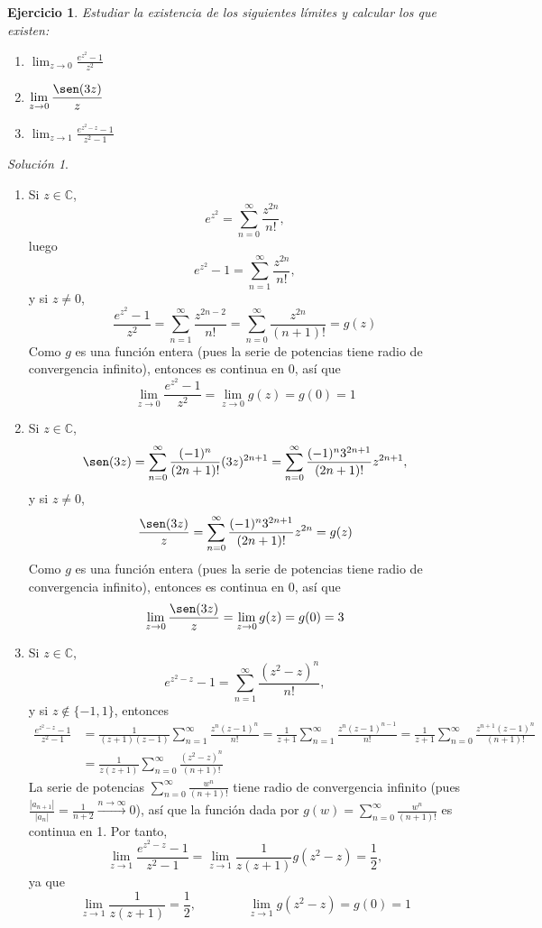 \documentclass[11pt]{report}
\newcommand{\C}{\mathbb C}
\newcommand{\serie}[2][0]{\sum_{n=#1}^\infty #2}
\newtheorem{exercise}{Ejercicio}
\theoremstyle{remark}
\newtheorem*{resolution}{Solución}
\begin{document}
\begin{exercise}
Estudiar la existencia de los siguientes límites y calcular los que existen:
\begin{enumerate}
    \item $\displaystyle \lim_{z \to 0}\frac{e^{z^2}-1}{z^2}$
    \item $\displaystyle \lim_{z \to 0} \frac{\sen(3z)}{z}$
    \item $\displaystyle \lim_{z \to 1} \frac{e^{z^2-z}-1}{z^2-1}$
\end{enumerate}
\end{exercise}

\begin{resolution}
\hfill
\begin{enumerate}
    \item Si $z \in \C$,
    \[e^{z^2} = \serie{\frac{z^{2n}}{n!}},\]
    luego
    \[e^{z^2}-1=\serie[1]{\frac{z^{2n}}{n!}},\]
    y si $z \neq 0$,
    \[\frac{e^{z^2}-1}{z^2} =\serie[1]{\frac{z^{2n-2}}{n!}} = \serie{\frac{z^{2n}}{(n+1)!}} = g(z)\]
    Como $g$ es una función entera (pues la serie de potencias tiene radio de convergencia infinito), entonces es continua en $0$, así que
    \[\lim_{z \to 0}\frac{e^{z^2}-1}{z^2} = \lim_{z \to 0} g(z) = g(0)=1\]
    \item Si $z \in \C$,
    \[\sen(3z)=\serie{\frac{(-1)^n}{(2n+1)!}(3z)^{2n+1}} = \serie{\frac{(-1)^n3^{2n+1}}{(2n+1)!}z^{2n+1}},\]
    y si $z \neq 0$,
    \[\frac{\sen(3z)}{z} = \serie{\frac{(-1)^n3^{2n+1}}{(2n+1)!}z^{2n}} = g(z)\]
    Como $g$ es una función entera (pues la serie de potencias tiene radio de convergencia infinito), entonces es continua en $0$, así que
    \[\lim_{z \to 0}\frac{\sen(3z)}{z} = \lim_{z \to 0} g(z) = g(0)=3\]
    \item Si $z \in \C$,
    \[e^{z^2-z}-1 = \serie[1]{\frac{(z^2-z)^n}{n!}},\]
    y si $z \not\in \{-1,1\}$, entonces
    \[
    \begin{aligned}
    \frac{e^{z^2-z}-1}{z^2-1} &= \frac{1}{(z+1)(z-1)}\serie[1]{\frac{z^n(z-1)^n}{n!}} =\frac{1}{z+1}\serie[1]{\frac{z^n(z-1)^{n-1}}{n!}} =\frac{1}{z+1}\serie{\frac{z^{n+1}(z-1)^{n}}{(n+1)!}} \\
    &=\frac{1}{z(z+1)}\serie{\frac{(z^2-z)^n}{(n+1)!}}
    \end{aligned}
    \]
    La serie de potencias $\serie{\frac{w^n}{(n+1)!}}$ tiene radio de convergencia infinito (pues $\frac{|a_{n+1}|}{|a_n|} =\frac{1}{n+2} \xrightarrow[]{n \to \infty}0$), así que la función dada por $g(w)=\serie{\frac{w^n}{(n+1)!}}$ es continua en 1. Por tanto,
    \[\lim_{z \to 1}\frac{e^{z^2-z}-1}{z^2-1} = \lim_{z \to 1}\frac{1}{z(z+1)}g(z^2-z) = \frac{1}{2},\]
    ya que
    \[\lim_{z \to 1} \frac{1}{z(z+1)} = \frac{1}{2}, \qquad \qquad \lim_{z \to 1}g(z^2-z)=g(0) = 1\]
\end{enumerate}
\end{resolution}
\end{document}
